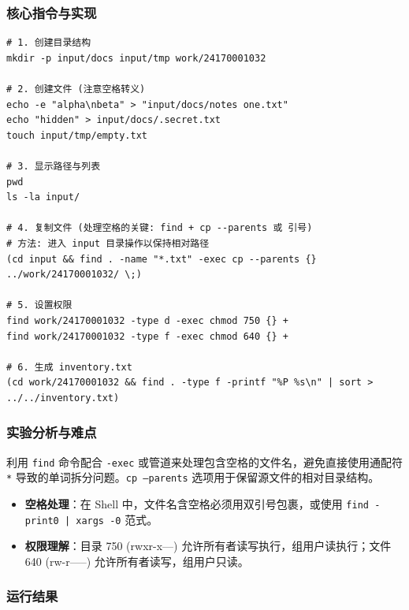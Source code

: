 \documentclass[12pt,a4paper]{article}
\begin{document}
\subsubsection{核心指令与实现}
\begin{lstlisting}[caption={实验一关键 Shell 指令}]
# 1. 创建目录结构
mkdir -p input/docs input/tmp work/24170001032

# 2. 创建文件 (注意空格转义)
echo -e "alpha\nbeta" > "input/docs/notes one.txt"
echo "hidden" > input/docs/.secret.txt
touch input/tmp/empty.txt

# 3. 显示路径与列表
pwd
ls -la input/

# 4. 复制文件 (处理空格的关键: find + cp --parents 或 引号)
# 方法: 进入 input 目录操作以保持相对路径
(cd input && find . -name "*.txt" -exec cp --parents {} ../work/24170001032/ \;)

# 5. 设置权限
find work/24170001032 -type d -exec chmod 750 {} +
find work/24170001032 -type f -exec chmod 640 {} +

# 6. 生成 inventory.txt
(cd work/24170001032 && find . -type f -printf "%P %s\n" | sort > ../../inventory.txt)
\end{lstlisting}

\subsubsection{实验分析与难点}
\begin{infobox}[实现思路]
利用 \texttt{find} 命令配合 \texttt{-exec} 或管道来处理包含空格的文件名，避免直接使用通配符 \texttt{*} 导致的单词拆分问题。\texttt{cp --parents} 选项用于保留源文件的相对目录结构。
\end{infobox}

\begin{keybox}[实现重点]
\begin{itemize}
    \item \textbf{空格处理}：在 Shell 中，文件名含空格必须用双引号包裹，或使用 \texttt{find -print0 | xargs -0} 范式。
    \item \textbf{权限理解}：目录 750 (rwxr-x---) 允许所有者读写执行，组用户读执行；文件 640 (rw-r-----) 允许所有者读写，组用户只读。
\end{itemize}
\end{keybox}

\subsubsection{运行结果}
\end{document}
